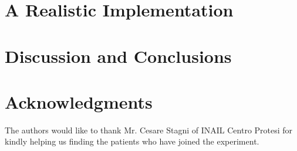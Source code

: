 \documentclass[journal]{IEEEtran}
\begin{document}
\section{A Realistic Implementation}
\label{sec:impl}


\section{Discussion and Conclusions}
\label{sec:discussion}


\section*{Acknowledgments}

The authors would like to thank Mr. Cesare Stagni of INAIL Centro
Protesi for kindly helping us finding the patients who have joined the
experiment.





\end{document}
